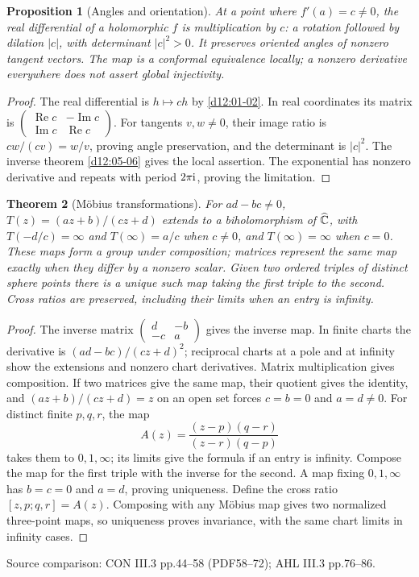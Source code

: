 \documentclass[11pt,a4paper,openany]{book}
\newtheorem{theorem}{Theorem}[chapter]
\newtheorem{proposition}[theorem]{Proposition}
\theoremstyle{definition}
\theoremstyle{remark}\newtheorem{remark}[theorem]{Remark}
\DeclareMathOperator{\Ree}{Re}\DeclareMathOperator{\Imm}{Im}
\newcommand{\family}[1]{}
\newcommand{\source}[1]{\par\begingroup\small\sffamily\color{black!65}Source comparison: #1\par\endgroup}
\begin{document}
\begin{proposition}[Angles and orientation]\family{D12.10.01}\label{d12:10-01}
At a point where $f'(a)=c\ne0$, the real differential of a holomorphic $f$ is multiplication by $c$: a rotation followed by dilation $|c|$, with determinant $|c|^2>0$. It preserves oriented angles of nonzero tangent vectors. The map is a conformal equivalence locally; a nonzero derivative everywhere does not assert global injectivity.
\end{proposition}
\begin{proof}
The real differential is $h\mapsto ch$ by \cref{d12:01-02}. In real coordinates its matrix is $\left(\begin{smallmatrix}\Ree c&-\Imm c\\\Imm c&\Ree c\end{smallmatrix}\right)$. For tangents $v,w\ne0$, their image ratio is $cw/(cv)=w/v$, proving angle preservation, and the determinant is $|c|^2$. The inverse theorem \cref{d12:05-06} gives the local assertion. The exponential has nonzero derivative and repeats with period $2\pi\mathrm i$, proving the limitation.
\end{proof}

\begin{theorem}[M\"obius transformations]\family{D12.10.02}\label{d12:10-02}
For $ad-bc\ne0$, $T(z)=(az+b)/(cz+d)$ extends to a biholomorphism of $\widehat{\mathbb C}$, with $T(-d/c)=\infty$ and $T(\infty)=a/c$ when $c\ne0$, and $T(\infty)=\infty$ when $c=0$. These maps form a group under composition; matrices represent the same map exactly when they differ by a nonzero scalar. Given two ordered triples of distinct sphere points there is a unique such map taking the first triple to the second. Cross ratios are preserved, including their limits when an entry is infinity.
\end{theorem}
\begin{proof}
The inverse matrix $\left(\begin{smallmatrix}d&-b\\-c&a\end{smallmatrix}\right)$ gives the inverse map. In finite charts the derivative is $(ad-bc)/(cz+d)^2$; reciprocal charts at a pole and at infinity show the extensions and nonzero chart derivatives. Matrix multiplication gives composition. If two matrices give the same map, their quotient gives the identity, and $(az+b)/(cz+d)=z$ on an open set forces $c=b=0$ and $a=d\ne0$.
For distinct finite $p,q,r$, the map
\[
 A(z)=\frac{(z-p)(q-r)}{(z-r)(q-p)}
\]
takes them to $0,1,\infty$; its limits give the formula if an entry is infinity. Compose the map for the first triple with the inverse for the second. A map fixing $0,1,\infty$ has $b=c=0$ and $a=d$, proving uniqueness. Define the cross ratio $[z,p;q,r]=A(z)$. Composing with any M\"obius map gives two normalized three-point maps, so uniqueness proves invariance, with the same chart limits in infinity cases.
\end{proof}
\source{CON III.3 pp.44--58 (PDF58--72); AHL III.3 pp.76--86.}
\end{document}
